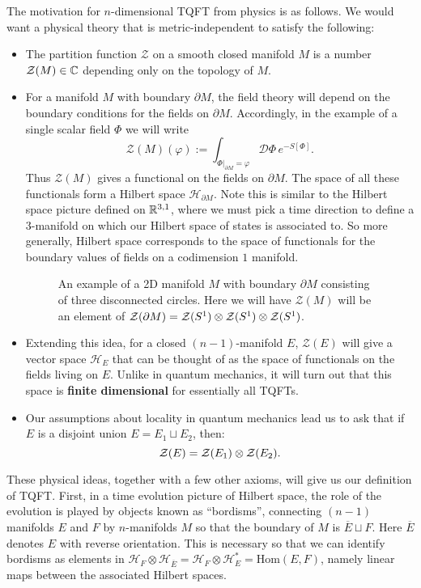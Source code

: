 	
	The motivation for $n$-dimensional TQFT from physics is as follows. We would want a physical theory that is metric-independent to satisfy the following: 
	\begin{itemize}
		\item The partition function $\mathcal Z$ on a smooth closed manifold $M$ is a number $\mathcal Z(M) \in \mathbb{C}$ depending only on the topology of $M$.
		\item For a manifold $M$ with boundary $\partial M$, the field theory will depend on the boundary conditions for the fields on $\partial M$. Accordingly, in the example of a single scalar field $\Phi$ we will write
		\[
			\mathcal Z(M) (\varphi) := \int_{\Phi|_{\partial M} = \varphi} \mathcal D \Phi\, e^{- S[\Phi]}.
		\]
		Thus $\mathcal Z(M)$ gives a functional on the fields on $\partial M$. The space of all these functionals form a Hilbert space $\mathcal H_{\partial M}$. Note this is similar to the Hilbert space picture defined on $\mathbb{R}^{3,1}$, where we must pick a time direction to define a $3$-manifold on which our Hilbert space of states is associated to. So more generally, Hilbert space corresponds to the space of functionals for the boundary values of fields on a codimension $1$ manifold.
		\begin{figure}
			\centering
			\caption{An example of a 2D manifold $M$ with boundary $\partial M$ consisting of three disconnected circles. Here we will have $\mathcal Z(M)$ will be an element of $\mathcal Z(\partial M) = \mathcal{Z}(S^1) \otimes \mathcal{Z}(S^1) \otimes \mathcal{Z}(S^1)$.}
			\label{fig:tqft1}
		\end{figure}
		\item Extending this idea, for a closed $(n-1)$-manifold $E$, $\mathcal Z(E)$ will give a vector space $\mathcal H_E$ that can be thought of as the space of functionals on the fields living on $E$. Unlike in quantum mechanics, it will turn out that this space is \textbf{finite dimensional} for essentially all TQFTs.
		\item Our assumptions about locality in quantum mechanics lead us to ask that if $E$ is a disjoint union $E = E_1 \sqcup E_2$, then:
		\[
			\mathcal{Z}(E) = \mathcal{Z}(E_1) \otimes \mathcal{Z}(E_2).
		\]
	\end{itemize}
	These physical ideas, together with a few other axioms, will give us our definition of TQFT. First, in a time evolution picture of Hilbert space, the role of the evolution is played by objects known as ``bordisms'', connecting $(n-1)$ manifolds $E$ and $F$ by $n$-manifolds $M$ so that the boundary of $M$ is $\overline E \sqcup F$. Here $\overline E$ denotes $E$ with reverse orientation. This is necessary so that we can identify bordisms as elements in $\mathcal H_{F} \otimes \mathcal H_{\overline E} = \mathcal H_{F} \otimes \mathcal H_E^*  = \mathrm{Hom}(E, F)$, namely linear maps between the associated Hilbert spaces.


